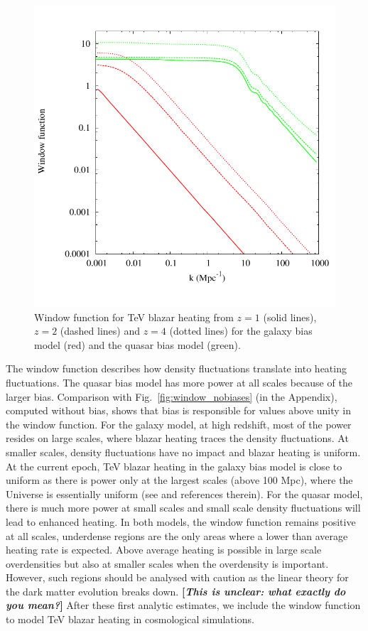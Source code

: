 \documentclass[twocolumns]{emulateapj}
\newcommand\Cc[1]{{\color{blue} \bf #1}} %
\begin{document}
\begin{figure}[h]
  \centering
  \includegraphics[width = .45\textwidth ]{window_gal_qso-eps-converted-to}
  \caption{Window function for TeV blazar heating from $z=1$ (solid lines), $z=2$ (dashed lines) and $z=4$ (dotted lines) for the galaxy bias model (red) and the quasar bias model (green).}
  \label{fig:window}
\end{figure}

The window function describes how density fluctuations translate into heating fluctuations. The quasar  bias model has more power at all scales because of the larger bias. Comparison with Fig.~\ref{fig:window_nobiases} (in the Appendix), computed without bias, shows that bias is responsible for values above unity in the window function. For the galaxy model, at high redshift, most of the power resides on large scales, where blazar heating traces the density fluctuations. At smaller scales, density fluctuations have no impact and blazar heating is uniform. At the current epoch, TeV blazar heating in the galaxy bias model is close to uniform as there is power only at the largest scales (above 100 Mpc), where the Universe is essentially uniform  (see \citet{2013MNRAS.429.2910C} and references therein). For the quasar model, there is much more power at small scales and small scale density fluctuations will lead to enhanced heating. In both models, the window function remains positive at all scales, underdense regions are the only areas where a lower than average heating rate is expected. Above average  heating is possible in large scale overdensities but also at  smaller scales when the overdensity is important.  However, such regions should be analysed with caution as the linear theory for the dark matter evolution breaks down. \Cc{[{\em This is unclear: what exactly do you mean?}]} After these first analytic estimates, we include the window function to model TeV blazar heating in cosmological simulations. 
\end{document}

